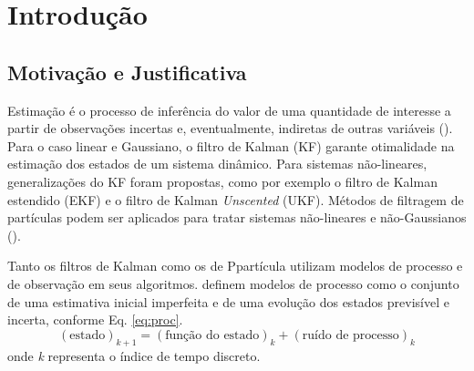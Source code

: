 

\tableofcontents*
\cleardoublepage



\textual

% 
%
%
\chapter{Introdução}


\section{Motivação e Justificativa}

Estimação é o processo de inferência do valor de uma quantidade de interesse a partir de observações incertas e, eventualmente, indiretas de outras variáveis (). Para o caso linear e Gaussiano, o filtro de Kalman (KF) garante otimalidade na estimação dos estados de um sistema dinâmico. Para sistemas não-lineares, generalizações do KF foram propostas, como por exemplo o filtro de Kalman estendido (EKF) e o filtro de Kalman \textit{Unscented} (UKF). Métodos de filtragem de partículas podem ser aplicados para tratar sistemas não-lineares e não-Gaussianos (). 

Tanto os filtros de Kalman como os de Ppartícula utilizam modelos de processo e de observação em seus algoritmos.  definem modelos de processo como o conjunto de uma estimativa inicial imperfeita e de uma evolução dos estados previsível e incerta, conforme Eq. \ref{eq:proc}.
\begin{equation}
	(\textrm{estado})_{k+1}=(\textrm{função do estado})_k+(\textrm{ruído de processo})_k
	\label{eq:proc}
\end{equation}
\noindent onde \textit{k} representa o índice de tempo discreto. 

